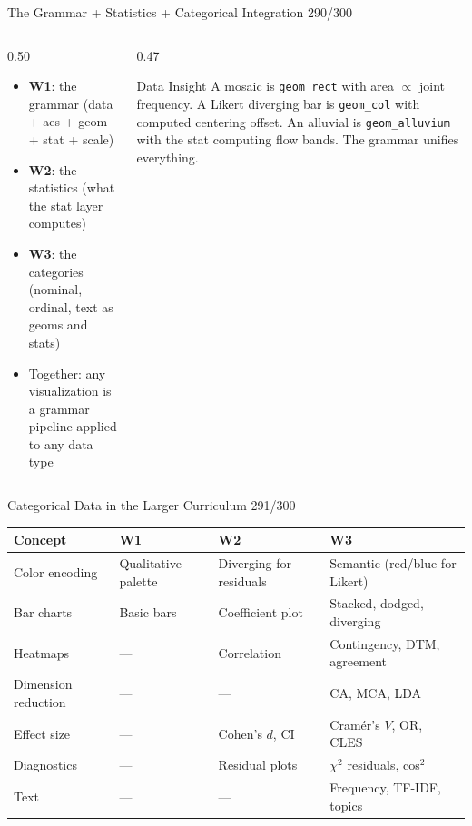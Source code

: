 \documentclass[10pt]{beamer}
\newcommand{\smark}[1]{\hfill{\scriptsize\color{codegray}#1}}
\begin{document}
\begin{frame}{The Grammar + Statistics + Categorical Integration}
\smark{290/300}
\begin{columns}[T]
\begin{column}{0.50\textwidth}
\begin{itemize}
    \item \textbf{W1}: the grammar (data + aes + geom + stat + scale)
    \item \textbf{W2}: the statistics (what the stat layer computes)
    \item \textbf{W3}: the categories (nominal, ordinal, text as geoms and stats)
    \item Together: any visualization is a grammar pipeline applied to any data type
\end{itemize}
\end{column}
\begin{column}{0.47\textwidth}
\begin{exampleblock}{Data Insight}
    \scriptsize A mosaic is \texttt{geom\_rect} with area $\propto$ joint frequency. A Likert diverging bar is \texttt{geom\_col} with computed centering offset. An alluvial is \texttt{geom\_alluvium} with the stat computing flow bands. The grammar unifies everything.
\end{exampleblock}
\end{column}
\end{columns}
\end{frame}

\begin{frame}{Categorical Data in the Larger Curriculum}
\smark{291/300}
\centering\small
\begin{tabular}{@{}llll@{}}
    \toprule
    \textbf{Concept} & \textbf{W1} & \textbf{W2} & \textbf{W3} \\
    \midrule
    Color encoding     & Qualitative palette    & Diverging for residuals & Semantic (red/blue for Likert) \\
    Bar charts         & Basic bars             & Coefficient plot        & Stacked, dodged, diverging \\
    Heatmaps           & ---                    & Correlation             & Contingency, DTM, agreement \\
    Dimension reduction& ---                    & ---                     & CA, MCA, LDA \\
    Effect size        & ---                    & Cohen's $d$, CI         & Cram\'er's $V$, OR, CLES \\
    Diagnostics        & ---                    & Residual plots          & $\chi^2$ residuals, cos$^2$ \\
    Text               & ---                    & ---                     & Frequency, TF-IDF, topics \\
    \bottomrule
\end{tabular}
\end{frame}
\end{document}
